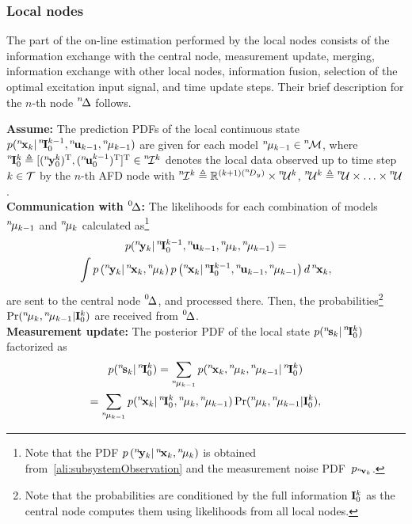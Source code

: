 \documentclass[conference,letterpaper]{IEEEtran}
\def\zeroth{\prescript{0\!}{}}
\def\nth{\prescript{n\!}{}}
\begin{document}
\subsubsection{Local nodes}\label{sec:local_nodes}
The part of the on-line estimation performed by the local nodes consists of the information exchange with the central node, measurement update, merging, information exchange with other local nodes, information fusion, selection of the optimal excitation input signal, and time update steps. Their brief description for the $n$-th node $\nth{\Delta}$ follows.

\textbf{Assume:} The prediction PDFs of the local continuous state $p(\nth{\bfx}_{k}\vert\nth{\bfI}^{k-1}_{0},\nth{\bfu}_{k-1},\nth{\mu}_{k-1})$ are given for each model $\nth{\mu}_{k-1}\in\nth{\mcM}$, where $\nth{\bfI}_0^k\triangleq[(\nth{\bfy}_{0}^{k})^{\T},(\nth{\bfu}_{0}^{k-1})^{\T}]^{\T}\in\nth{\mcI}^k$ denotes the local data observed up to time step $k \in \mathcal{T}$ by the $n$-th AFD node with $\nth{\mcI}^{k}\triangleq\bbR^{(k+1)(\nth{D}_y)}\times\nth{\mcU}^{k}$, $\nth{\mcU}^{k}\triangleq\nth{\mcU}\times\ldots\times\nth{\mcU}$.\\
\textbf{Communication with $\zeroth{\Delta}$:} The likelihoods for each combination of models $\nth{\mu}_{k-1}$ and $\nth{\mu}_k$ calculated as\footnote{Note that the PDF $p\left(\nth{\bfy}_{k}\vert\nth{\bfx}_{k},\nth{\mu}_k\right)$ is obtained from~\eqref{ali:subsystemObservation} and the measurement noise PDF~$p_{\nth{\bfv}_k}$.}
\begin{multline*}
  p(\nth{\bfy}_k\vert\nth{\bfI}_0^{k-1},\nth{\bfu}_{k-1},\nth{\mu}_k,\nth{\mu}_{k-1})=\\
  \int p\left(\nth{\bfy}_{k} \vert\nth{\bfx}_{k},\nth{\mu}_k\right) 
  p\left(\nth{\bfx}_{k}\vert
  \nth{\bfI}^{k-1}_{0},\nth{\bfu}_{k-1},\nth{\mu}_{k-1}\right)d\nth{\bfx}_k,
 \end{multline*}
are sent to the central node $\zeroth{\Delta}$, and processed there.
Then, the probabilities\footnote{Note that the probabilities are conditioned by the full information $\mathbf{I}_0^k$ as the central node computes them using likelihoods from all local nodes.} $\Pr(\nth{\mu}_k,\nth{\mu}_{k-1}|\bfI_0^k)$ are received from $\zeroth{\Delta}$.\\
\textbf{Measurement update:}
The posterior PDF of the local state $p(\nth{\bfs}_{k} \vert\nth{\bfI}^{k}_{0})$ factorized as
\begin{multline}\label{ali:PDF_BRR_Posterior}
  p(\nth{\bfs}_{k} \vert\nth{\bfI}^{k}_{0})=\sum_{\nth{\mu}_{k-1}} 
  p(\nth{\bfx}_{k},\nth{\mu}_k,\nth{\mu}_{k-1} \vert \nth{\bfI}^{k}_{0})
  \\=\sum_{\nth{\mu}_{k-1}}
  p(\nth{\bfx}_{k}\vert\nth{\bfI}^{k}_{0},\nth{\mu}_k,\nth{\mu}_{k-1})
  \Pr(\nth{\mu}_k,\nth{\mu}_{k-1} \vert \bfI^{k}_{0} ),
\end{multline}
\end{document}
